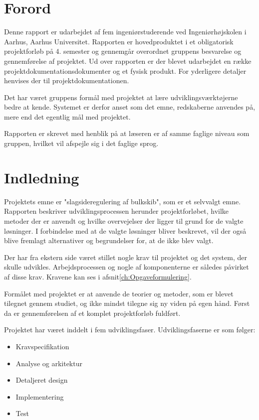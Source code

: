 \chapter{Forord}
\label{ch:forord}
Denne rapport er udarbejdet af fem ingeniørstuderende ved Ingeniørhøjskolen i Aarhus, Aarhus Universitet. Rapporten er hovedproduktet i et obligatorisk projektforløb på 4. semester og gennemgår overordnet gruppens besvarelse og gennemførelse af projektet. Ud over rapporten er der blevet udarbejdet en række projektdokumentationsdokumenter og et fysisk produkt. For yderligere detaljer henvises der til projektdokumentationen.

Det har været gruppens formål med projektet at lære udviklingsværktøjerne bedre at kende. Systemet er derfor anset som det emne, redskaberne anvendes på, mere end det egentlig mål med projektet.
 
Rapporten er skrevet med henblik på at læseren er af samme faglige niveau som gruppen, hvilket vil afspejle sig i det faglige sprog. 

\chapter{Indledning}
Projektets emne er "slagsideregulering af bulkskib", som er et selvvalgt emne. Rapporten beskriver udviklingsprocessen herunder projektforløbet, hvilke metoder der er anvendt og hvilke overvejelser der ligger til grund for de valgte løsninger. I forbindelse med at de valgte løsninger bliver beskrevet, vil der også blive fremlagt alternativer og begrundelser for, at de ikke blev valgt. 

Der har fra ekstern side været stillet nogle krav til projektet og det system, der skulle udvikles. Arbejdsprocessen og nogle af komponenterne er således påvirket af disse krav. Kravene kan ses i afsnit\ref{ch:Opgaveformulering}.

Formålet med projektet er at anvende de teorier og metoder, som er blevet tilegnet gennem studiet, og ikke mindst tilegne sig ny viden på egen hånd. Først da er gennemførelsen af et komplet projektforløb fuldført.

Projektet har været inddelt i fem udviklingsfaser. Udviklingsfaserne er som følger:
\begin{itemize}
\item Kravspecifikation
\item Analyse og arkitektur
\item Detaljeret design
\item Implementering
\item Test
\end{itemize}


